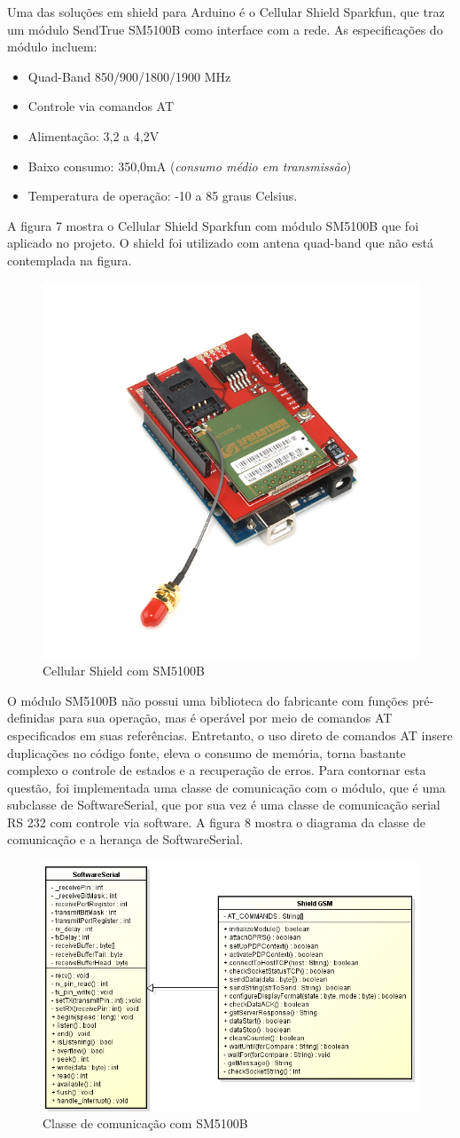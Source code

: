 Uma das soluções em shield para Arduino é o Cellular Shield Sparkfun, que traz um
módulo SendTrue SM5100B como interface com a rede. As especificações do módulo incluem:

\begin{itemize}
			\item Quad-Band 850/900/1800/1900 MHz
			\item Controle via comandos AT
			\item Alimentação: 3,2 a 4,2V
			\item Baixo consumo: 350,0mA (\textit{consumo médio em transmissão})
			\item Temperatura de operação: -10 a 85 graus Celsius.
\end{itemize}

A figura 7 mostra o Cellular Shield Sparkfun com módulo SM5100B que foi aplicado
no projeto. O shield foi utilizado com antena quad-band que não está contemplada
na figura.

\begin{figure}[!htb]
	\centering
	\includegraphics[width=4.00cm\textwidth]{figures/gsm.jpg}
	\caption{Cellular Shield com SM5100B}
	\label{Figura 7}
\end{figure}

O módulo SM5100B não possui uma biblioteca do fabricante com funções pré-definidas para sua 
operação, mas é operável por meio de comandos AT especificados em suas referências. Entretanto,
o uso direto de comandos AT insere duplicações no código fonte, eleva o consumo de memória,
torna bastante complexo o controle de estados e a recuperação de erros. Para contornar esta questão,
foi implementada uma classe de comunicação com o módulo, que é uma subclasse de SoftwareSerial, que por
sua vez é uma classe de comunicação serial RS 232 com controle via software. A figura 8 mostra o diagrama
da classe de comunicação e a herança de SoftwareSerial.

\begin{figure}[!htb]
	\centering
	\includegraphics[width=9.00cm\textwidth]{figures/lib_gsm.png}
	\caption{Classe de comunicação com SM5100B}
	\label{Figura 8}
\end{figure}

